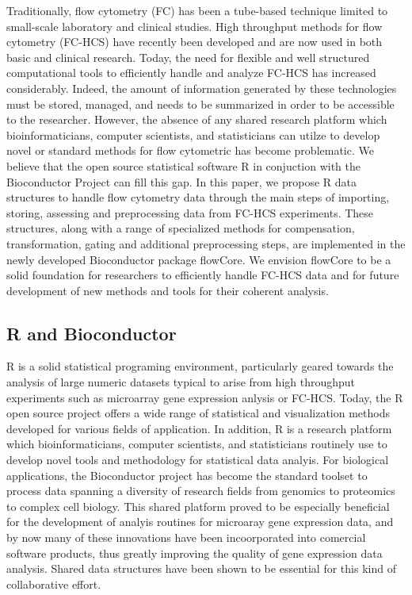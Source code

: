 \documentclass[12pt]{article}
\begin{document}
Traditionally, flow cytometry (FC) has been a tube-based technique
limited to small-scale laboratory and clinical studies.  High
throughput methods for flow cytometry (FC-HCS) have recently been
developed and are now used in both basic and clinical research. Today,
the need for flexible and well structured computational tools to
efficiently handle and analyze FC-HCS has increased
considerably. Indeed, the amount of information generated by these
technologies must be stored, managed, and needs to be summarized in
order to be accessible to the researcher. However, the absence of any
shared research platform which bioinformaticians, computer scientists,
and statisticians can utilze to develop novel or standard methods for
flow cytometric has become problematic. We believe that the open
source statistical software R in conjuction with the Bioconductor
Project can fill this gap.  In this paper, we propose R data
structures to handle flow cytometry data through the main steps of
importing, storing, assessing and preprocessing data from FC-HCS
experiments. These structures, along with a range of specialized
methods for compensation, transformation, gating and additional
preprocessing steps, are implemented in the newly developed
Bioconductor package flowCore.  We envision flowCore to be a solid
foundation for researchers to efficiently handle FC-HCS data and for
future development of new methods and tools for their coherent
analysis.


\subsection{R and Bioconductor}
R is a solid statistical programing environment, particularly geared
towards the analysis of large numeric datasets typical to arise from
high throughput experiments such as microarray gene expression anlysis
or FC-HCS. Today, the R open source project offers a wide range of
statistical and visualization methods developed for various fields of
application. In addition, R is a research platform which
bioinformaticians, computer scientists, and statisticians routinely
use to develop novel tools and methodology for statistical data
analyis. For biological applications, the Bioconductor project has
become the standard toolset \citep{gentleman2006bos} to process data
spanning a diversity of research fields from genomics to proteomics to
complex cell biology. This shared platform proved to be especially
beneficial for the development of analyis routines for microaray gene
expression data, and by now many of these innovations have been
incoorporated into comercial software products, thus greatly improving
the quality of gene expression data analysis. Shared data structures
have been shown to be essential for this kind of collaborative effort.
\end{document}
